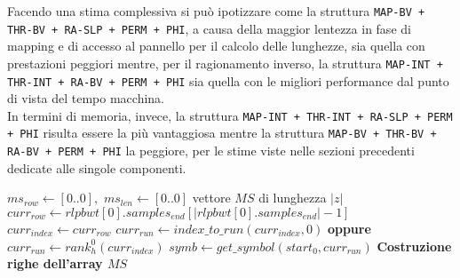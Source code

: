 Facendo una stima complessiva si può ipotizzare come la struttura \texttt{MAP-BV
+ THR-BV + RA-SLP + PERM + PHI}, a causa della maggior lentezza in fase di
mapping e di accesso al pannello per il calcolo delle lunghezze, sia quella con
prestazioni peggiori mentre, per il ragionamento inverso, la struttura
\texttt{MAP-INT + THR-INT + RA-BV + PERM + PHI} sia quella con le migliori
performance dal punto di vista del tempo macchina.\\
In termini di memoria, invece,  la struttura
\texttt{MAP-INT + THR-INT + RA-SLP + PERM + PHI} risulta essere la più
vantaggiosa mentre la struttura
\texttt{MAP-BV + THR-BV + RA-BV + PERM + PHI} la peggiore, per le stime viste
nelle sezioni precedenti dedicate alle singole componenti. 
\begin{algorithm}
  \scriptsize
  \begin{algorithmic}[1]
    \State $ms_{row}\gets [0..0],\,\,ms_{len}\gets [0..0]$
    \Comment vettore $MS$ di lunghezza $|z|$
    \State $curr_{row}\gets
    rlpbwt[0].samples_{end}[|rlpbwt[0].samples_{end}|-1]$
    \State $curr_{index}\gets curr_{row}$
    \State  $curr_{run}\gets index\_to\_run(curr_{index},0)$ \textbf{oppure}
    $curr_{run}\gets rank_h^0(curr_{index})$    
    \State $symb\gets get\_symbol(start_0, curr_{run})$
    \Comment \textbf{Costruzione righe dell'array $MS$}
    \For {\textit{every} $k\in[0, |z|)$}


\end{algorithmic}
\end{algorithm}
